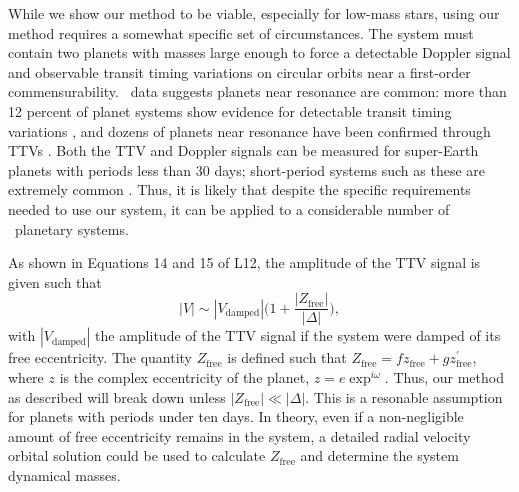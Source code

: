 While we show our method to be viable, especially for low-mass stars, using our method requires a somewhat specific set of circumstances. The system must contain two planets with masses large enough to force a detectable Doppler signal and observable transit timing variations on circular orbits near a first-order commensurability. \kep\ data suggests planets near resonance are common: more than 12 percent of planet systems show evidence for detectable transit timing variations \citep{Ford12a}, and dozens of planets near resonance have been confirmed through TTVs \citep{Steffen12b}. Both the TTV and Doppler signals can be measured for super-Earth planets with periods less than 30 days; short-period systems such as these are extremely common \citep{Howard12}. Thus, it is likely that despite the specific requirements needed to use our system, it can be applied to a considerable number of \kep\ planetary systems.

As shown in Equations 14 and 15 of L12, the amplitude of the TTV signal is given such that
\begin{equation}
|V| \sim |V_\textrm{damped}|\bigg(1 + \frac{|Z_\textrm{free}|}{|\Delta|}\bigg),
\end{equation}
with $|V_\textrm{damped}|$ the amplitude of the TTV signal if the system were damped of its free eccentricity. The quantity $Z_\textrm{free}$ is defined such that $Z_\textrm{free} = f z_\textrm{free} + g z^\prime_\textrm{free}$, where $z$ is the complex eccentricity of the planet, $z = e\exp^{i \omega}$. Thus, our method as described will break down unless $|Z_{\textrm{free}}| \ll |\Delta|$. This is a resonable assumption for planets with periods under ten days. In theory, even if a non-negligible amount of free eccentricity remains in the system, a detailed radial velocity orbital solution could be used to calculate $Z_{\textrm{free}}$ and determine the system dynamical masses.

